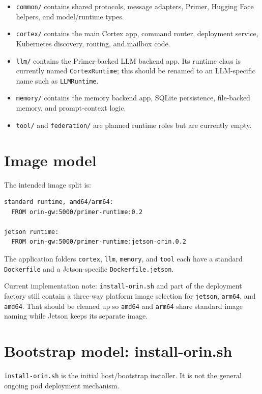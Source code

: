 \documentclass[11pt,a4paper]{article}
\begin{document}
\begin{itemize}[leftmargin=1.2em]
  \item \texttt{common/} contains shared protocols, message adapters, Primer, Hugging Face helpers, and model/runtime types.
  \item \texttt{cortex/} contains the main Cortex app, command router, deployment service, Kubernetes discovery, routing, and mailbox code.
  \item \texttt{llm/} contains the Primer-backed LLM backend app. Its runtime class is currently named \texttt{CortexRuntime}; this should be renamed to an LLM-specific name such as \texttt{LLMRuntime}.
  \item \texttt{memory/} contains the memory backend app, SQLite persistence, file-backed memory, and prompt-context logic.
  \item \texttt{tool/} and \texttt{federation/} are planned runtime roles but are currently empty.
\end{itemize}

\section{Image model}
The intended image split is:
\begin{lstlisting}
standard runtime, amd64/arm64:
  FROM orin-gw:5000/primer-runtime:0.2

jetson runtime:
  FROM orin-gw:5000/primer-runtime:jetson-orin.0.2
\end{lstlisting}

The application folders \texttt{cortex}, \texttt{llm}, \texttt{memory}, and \texttt{tool} each have a standard \texttt{Dockerfile} and a Jetson-specific \texttt{Dockerfile.jetson}.

\begin{infobox}
Current implementation note: \texttt{install-orin.sh} and part of the deployment factory still contain a three-way platform image selection for \texttt{jetson}, \texttt{arm64}, and \texttt{amd64}. That should be cleaned up so \texttt{amd64} and \texttt{arm64} share standard image naming while Jetson keeps its separate image.
\end{infobox}

\section{Bootstrap model: install-orin.sh}
\texttt{install-orin.sh} is the initial host/bootstrap installer. It is not the general ongoing pod deployment mechanism.
\end{document}
